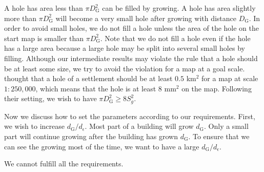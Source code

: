 \documentclass[graybox]{svmult}
\begin{document}
A hole has area less than $\pi D_\mathrm{G}^2$ can be filled by growing. 
A hole has area 
slightly more than $\pi D_\mathrm{G}^2$ will become a very small hole after 
growing with 
distance $D_\mathrm{G}$. In order to avoid small holes, we do not fill a hole 
unless the 
area of the hole on the start map is smaller than $\pi D_\mathrm{G}^2$. Note 
that we do 
not fill a hole even if the hole has a large area because a large hole may be 
split into several small holes by filling. 
Although our intermediate results may violate the rule that a hole should be at 
least some size, we try to avoid the violation for a map at a goal scale.
\textcite{Chaudhry2008} thought that a hole of a settlement should be at least 
$0.5$ km$^2$ for a map at scale $1:250{,}000$, which means that the hole is at 
least $8$ mm$^2$ on the map. Following their setting, we wish to have $\pi 
D_\mathrm{G}^2 \ge 8 S_g^2$.


Now we discuss how to set the parameters according to our requirements. First, 
we wish to increase $d_\mathrm{G}/d_\epsilon$. Most part of a building will 
grow $d_\mathrm{G}$. Only a small part will continue growing after the building 
has grown $d_\mathrm{G}$. To ensure that we can see the growing most of the 
time, we want to have a large $d_\mathrm{G}/d_\epsilon$.





We cannot fulfill all the requirements. 
\end{document}
